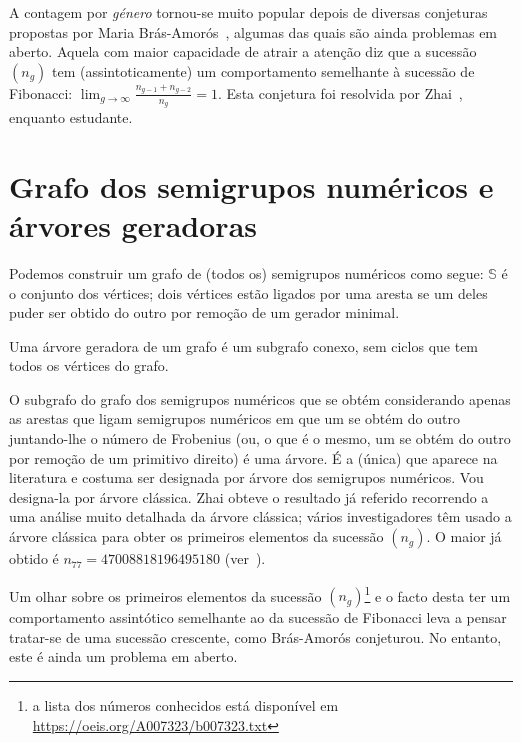 \documentclass[12pt,a4paper]{article}
\numberwithin{table}{section}
\numberwithin{figure}{section}
\numberwithin{equation}{section}
\theoremstyle{definition}
\theoremstyle{remark}
\begin{document}
A contagem por \emph{género} tornou-se muito popular depois de diversas conjeturas propostas por Maria Brás-Amorós~\cite{Bras-Amoros2008SF-Fibonacci}, algumas das quais são ainda problemas em aberto.
Aquela com maior capacidade de atrair a atenção diz que a sucessão \(\left(n_g\right)\) tem (assintoticamente) um comportamento semelhante à sucessão de Fibonacci: \(\lim_{g\to \infty} \frac{n_{g-1}+n_{g-2}}{n_g} = 1\).
Esta conjetura foi resolvida por Zhai~\cite{Zhai2013SF-Fibonacci}, enquanto estudante. 



\section{Grafo dos semigrupos numéricos e árvores geradoras}\label{sec:NSgraph}

Podemos construir um grafo de (todos os) semigrupos numéricos como segue: \(\mathbb{S}\) é o conjunto dos vértices; dois vértices estão ligados por uma aresta se um deles puder ser obtido do outro por remoção de um gerador minimal.

Uma árvore geradora de um grafo é um subgrafo conexo, sem ciclos que tem todos os vértices do grafo.

O subgrafo do grafo dos semigrupos numéricos que se obtém considerando apenas as arestas que ligam semigrupos numéricos em que um se obtém do outro juntando-lhe o número de Frobenius (ou, o que é o mesmo, um se obtém do outro por remoção de um primitivo direito) é uma árvore. É a (única) que aparece na literatura e costuma ser designada por árvore dos semigrupos numéricos. Vou designa-la por árvore clássica. Zhai obteve o resultado já referido recorrendo a uma análise muito detalhada da árvore clássica; vários investigadores têm usado a árvore clássica para obter os primeiros elementos da sucessão \(\left(n_g\right)\). O maior já obtido é \(n_{77} = \num{47008818196495180}\) (ver~\cite{oeis_ns_counting_genus}).

Um olhar sobre os primeiros elementos da sucessão \(\left(n_g\right)\)\footnote{a lista dos números conhecidos está disponível em \url{https://oeis.org/A007323/b007323.txt}} e o facto desta ter um comportamento assintótico semelhante ao da sucessão de Fibonacci leva a  pensar tratar-se de uma sucessão crescente, como Brás-Amorós conjeturou. No entanto, este é ainda um problema em aberto.
\end{document}
